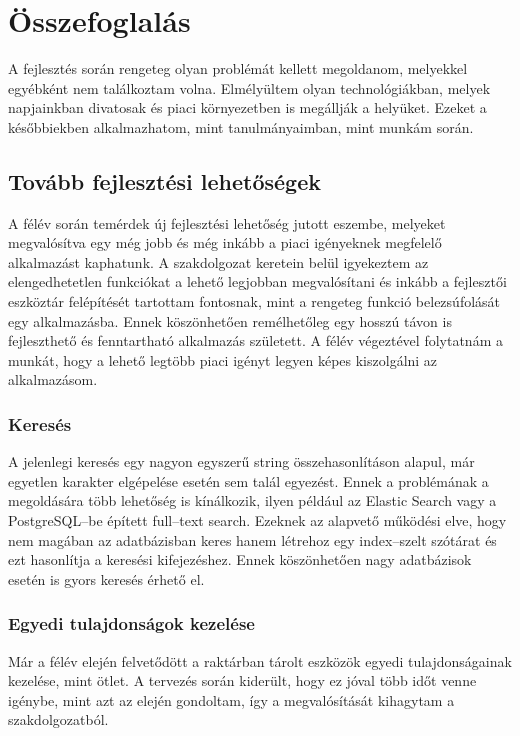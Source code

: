\chapter{Összefoglalás}

A fejlesztés során rengeteg olyan problémát kellett megoldanom, melyekkel egyébként nem találkoztam volna.
Elmélyültem olyan technológiákban, melyek napjainkban divatosak és piaci környezetben is megállják a helyüket.
Ezeket a későbbiekben alkalmazhatom, mint tanulmányaimban, mint munkám során.

\section{Tovább fejlesztési lehetőségek}
A félév során temérdek új fejlesztési lehetőség jutott eszembe, melyeket megvalósítva egy még jobb és még inkább a piaci igényeknek megfelelő alkalmazást kaphatunk.
A szakdolgozat keretein belül igyekeztem az elengedhetetlen funkciókat a lehető legjobban megvalósítani és inkább a fejlesztői eszköztár felépítését tartottam fontosnak, mint a rengeteg funkció belezsúfolását egy alkalmazásba.
Ennek köszönhetően remélhetőleg egy hosszú távon is fejleszthető és fenntartható alkalmazás született.
A félév végeztével folytatnám a munkát, hogy a lehető legtöbb piaci igényt legyen képes kiszolgálni az alkalmazásom.

\subsection{Keresés}
A jelenlegi keresés egy nagyon egyszerű string összehasonlításon alapul, már egyetlen karakter elgépelése esetén sem talál egyezést.
Ennek a problémának a megoldására több lehetőség is kínálkozik, ilyen például az Elastic Search vagy a PostgreSQL–be épített full–text search.
Ezeknek az alapvető működési elve, hogy nem magában az adatbázisban keres hanem létrehoz egy index–szelt szótárat és ezt hasonlítja a keresési kifejezéshez.
Ennek köszönhetően nagy adatbázisok esetén is gyors keresés érhető el.

\subsection{Egyedi tulajdonságok kezelése}
Már a félév elején felvetődött a raktárban tárolt eszközök egyedi tulajdonságainak kezelése, mint ötlet.
A tervezés során kiderült, hogy ez jóval több időt venne igénybe, mint azt az elején gondoltam, így a megvalósítását kihagytam a szakdolgozatból.

